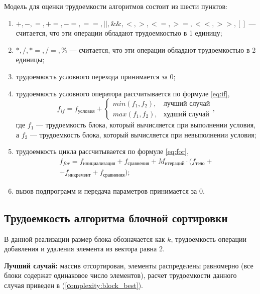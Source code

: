 Модель для оценки трудоемкости алгоритмов состоит из шести пунктов:
\begin{enumerate}
	\item $+, -, =, +=, -=, ==, ||, \&\&, <, >, <=, >=, <<, >>, []$ --- считается, что эти операции обладают трудоемкостью в 1 единицу;
	\item $*, /, *=, /=, \% $ --- считается, что эти операции обладают трудоемкостью в 2 единицы;
	\item трудоемкость условного перехода принимается за $0$;
	\item трудоемкость условного оператора рассчитывается по формуле \eqref{eq:if},
	\begin{equation}
		\label{eq:if}
		f_{if} = f_{\text{условия}} + 
		\begin{cases}
			min(f_1, f_2), & \text{лучший случай}\\
			max(f_1, f_2), & \text{худший случай}
		\end{cases},
	\end{equation}
	где $f_1$ --- трудоемкость блока, который вычисляется при выполнении условия, а $f_2$ --- трудоемкость блока, который вычисляется при невыполнении условия;
	\item трудоемкость цикла рассчитывается по формуле \eqref{eq:for},
	\begin{equation}
		\label{eq:for}
		\begin{gathered}
			f_{for} = f_{\text{инициализация}} + f_{\text{сравнения}} + M_{\text{итераций}} \cdot (f_{\text{тело}} +\\
			+ f_{\text{инкремент}} + f_{\text{сравнения}});
		\end{gathered}
	\end{equation}
	\item вызов подпрограмм и передача параметров принимается за $0$.
\end{enumerate}

\subsection{Трудоемкость алгоритма блочной сортировки}

В данной реализации размер блока обозначается как $k$, трудоемкость операции добавления и удаления элемента из вектора равна 2.


\textbf{Лучший случай:} массив отсортирован, элементы распределены равномерно (все блоки содержат одинаковое число элементов), расчет трудоемкости данного случая приведен в (\ref{сomplexity:block_best}).


